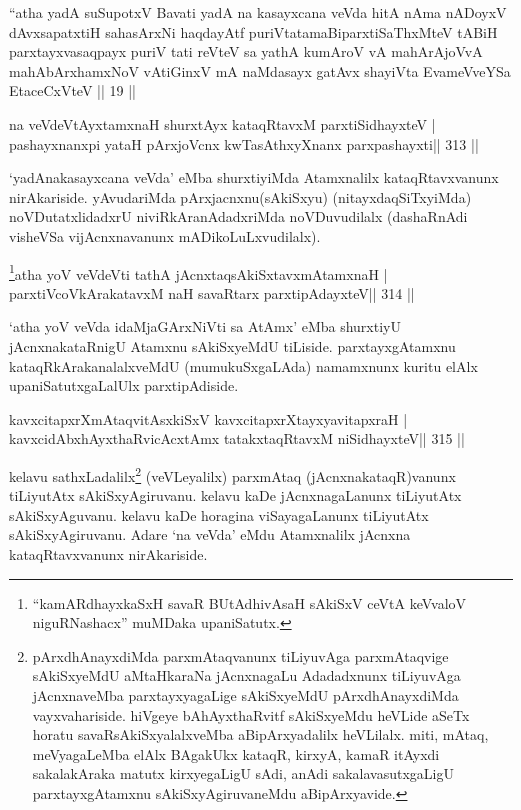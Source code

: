 \begin{kandikeshl}
``atha yadA suSupotxV Bavati yadA na kasayxcana veVda
hitA nAma nADoyxV dAvxsapatxtiH sahasArxNi haqdayAtf
puriVtatamaBiparxtiSaThxMteV tABiH parxtayxvasaqpayx puriV
tati reVteV sa yathA kumAroV vA mahArAjoVvA 
mahAbArxhamxNoV vA\s tiGinxV mA naMdasayx gatAvx shayiVta 
EvameVveYSa EtaceCxVteV || 19 ||
\end{kandikeshl}


\begin{shl}
na veVdeVtAyxtamxnaH shurxtAyx kataqRtavxM parxtiSidhayxteV |
pashayxnanxpi yataH pArxjoVcnx kwTasAthxyXnanx parxpashayxti\hfill || 313 ||
\end{shl}

\begin{artha}
`yadAnakasayxcana veVda' eMba shurxtiyiMda Atamxnalilx kataqRtavxvanunx  nirAkariside. yAvudariMda pArxjacnxnu(sAkiSxyu) (nitayxdaqSiTxyiMda)  noVDutatxlidadxrU niviRkAranAdadxriMda noVDuvudilalx (dashaRnAdi visheVSa vijAcnxnavanunx mADikoLuLxvudilalx).
\end{artha}


\begin{shl}
\footnote{``kamARdhayxkaSxH savaR BUtAdhivAsaH sAkiSxV ceVtA keVvaloV niguRNashacx'' muMDaka upaniSatutx.}atha yoV veVdeVti tathA jAcnxtaqsAkiSxtavxmAtamxnaH |
parxtiVcoV\s kArakatavxM naH savaRtarx parxtipAdayxteV\hfill || 314 ||
\end{shl}

\begin{artha}
`atha yoV veVda idaMjaGArxNiVti sa AtAmx' eMba shurxtiyU jAcnxnakataRnigU  Atamxnu sAkiSxyeMdU tiLiside. parxtayxgAtamxnu kataqRkArakanalalxveMdU (mumukuSxgaLAda) namamxnunx kuritu elAlx upaniSatutxgaLalUlx parxtipAdiside.
\end{artha}


\begin{shl}
kavxcitapxrXmAtaqvitAsxkiSxV kavxcitapxrXtayxyavitapxraH |
kavxcidAbxhAyxthaRvicAcx\s\s tAmx tatakxtaqRtavxM niSidhayxteV\hfill || 315 ||
\end{shl}

\begin{artha}
kelavu sathxLadalilx\footnote{pArxdhAnayxdiMda parxmAtaqvanunx  tiLiyuvAga parxmAtaqvige sAkiSxyeMdU aMtaHkaraNa jAcnxnagaLu Adadadxnunx  tiLiyuvAga jAcnxnaveMba parxtayxyagaLige sAkiSxyeMdU pArxdhAnayxdiMda  vayxvahariside. hiVgeye bAhAyxthaRvitf sAkiSxyeMdu heVLide aSeTx horatu savaRsAkiSxyalalxveMba aBipArxyadalilx heVLilalx. miti, mAtaq, meVyagaLeMba elAlx BAgakUkx kataqR, kirxyA, kamaR itAyxdi sakalakAraka matutx kirxyegaLigU sAdi, anAdi sakalavasutxgaLigU parxtayxgAtamxnu sAkiSxyAgiruvaneMdu aBipArxyavide.} (veVLeyalilx) parxmAtaq (jAcnxnakataqR)vanunx tiLiyutAtx sAkiSxyAgiruvanu. kelavu kaDe jAcnxnagaLanunx tiLiyutAtx sAkiSxyAguvanu. kelavu kaDe horagina viSayagaLanunx tiLiyutAtx sAkiSxyAgiruvanu. Adare `na veVda' eMdu Atamxnalilx jAcnxna kataqRtavxvanunx nirAkariside.
\end{artha}

